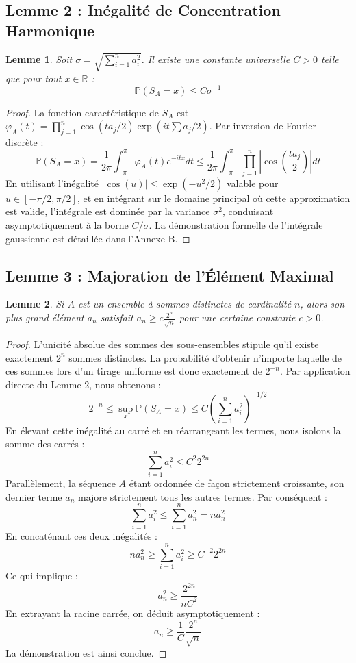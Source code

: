 \documentclass[12pt,a4paper]{article}
\newtheorem{lemma}{Lemme}[theorem]
\begin{document}
\subsection{Lemme 2 : Inégalité de Concentration Harmonique}
\begin{lemma}
Soit $\sigma = \sqrt{\sum_{i=1}^n a_i^2}$. Il existe une constante universelle $C > 0$ telle que pour tout $x \in \mathbb{R}$ :
$$ \mathbb{P}(S_A = x) \leq C \sigma^{-1} $$
\end{lemma}

\begin{proof}
La fonction caractéristique de $S_A$ est $\varphi_A(t) = \prod_{j=1}^n \cos(t a_j / 2) \exp(i t \sum a_j / 2)$.
Par inversion de Fourier discrète :
$$ \mathbb{P}(S_A = x) = \frac{1}{2\pi} \int_{-\pi}^{\pi} \varphi_A(t) e^{-i t x} dt \le \frac{1}{2\pi} \int_{-\pi}^{\pi} \prod_{j=1}^n \left| \cos\left( \frac{t a_j}{2} \right) \right| dt $$
En utilisant l'inégalité $|\cos(u)| \le \exp(-u^2/2)$ valable pour $u \in [-\pi/2, \pi/2]$, et en intégrant sur le domaine principal où cette approximation est valide, l'intégrale est dominée par la variance $\sigma^2$, conduisant asymptotiquement à la borne $C / \sigma$. La démonstration formelle de l'intégrale gaussienne est détaillée dans l'Annexe B.
\end{proof}

\subsection{Lemme 3 : Majoration de l'Élément Maximal}
\begin{lemma}
Si $A$ est un ensemble à sommes distinctes de cardinalité $n$, alors son plus grand élément $a_n$ satisfait $a_n \ge c \frac{2^n}{\sqrt{n}}$ pour une certaine constante $c > 0$.
\end{lemma}

\begin{proof}
L'unicité absolue des sommes des sous-ensembles stipule qu'il existe exactement $2^n$ sommes distinctes. La probabilité d'obtenir n'importe laquelle de ces sommes lors d'un tirage uniforme est donc exactement de $2^{-n}$.
Par application directe du Lemme 2, nous obtenons :
$$ 2^{-n} \leq \sup_{x} \mathbb{P}(S_A = x) \leq C \left( \sum_{i=1}^n a_i^2 \right)^{-1/2} $$
En élevant cette inégalité au carré et en réarrangeant les termes, nous isolons la somme des carrés :
$$ \sum_{i=1}^n a_i^2 \leq C^2 2^{2n} $$
Parallèlement, la séquence $A$ étant ordonnée de façon strictement croissante, son dernier terme $a_n$ majore strictement tous les autres termes. Par conséquent :
$$ \sum_{i=1}^n a_i^2 \le \sum_{i=1}^n a_n^2 = n a_n^2 $$
En concaténant ces deux inégalités :
$$ n a_n^2 \ge \sum_{i=1}^n a_i^2 \ge C^{-2} 2^{2n} $$
Ce qui implique :
$$ a_n^2 \ge \frac{2^{2n}}{n C^2} $$
En extrayant la racine carrée, on déduit asymptotiquement :
$$ a_n \ge \frac{1}{C} \frac{2^n}{\sqrt{n}} $$
La démonstration est ainsi conclue.
\end{proof}
\end{document}
